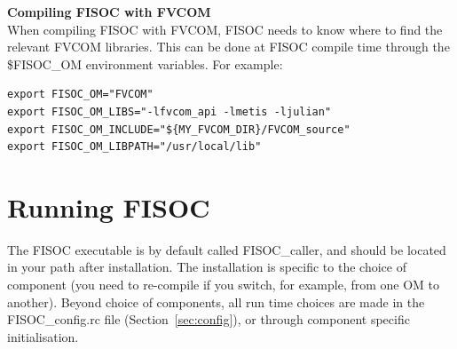 \documentclass[11pt]{article}
\begin{document}
\vspace{10pt}
\textbf{Compiling FISOC with FVCOM}\\
When compiling FISOC with FVCOM, FISOC needs to know where to 
find the relevant FVCOM libraries.  
This can be done at FISOC compile time through the 
\$FISOC\_OM
environment variables.  For example:

\begin{lstlisting}
export FISOC_OM="FVCOM"
export FISOC_OM_LIBS="-lfvcom_api -lmetis -ljulian"
export FISOC_OM_INCLUDE="${MY_FVCOM_DIR}/FVCOM_source"
export FISOC_OM_LIBPATH="/usr/local/lib"
\end{lstlisting}














\section{Running FISOC}
\label{sec:FISOC_SUG}

The FISOC executable is by default called FISOC\_caller, and should be located in your 
path after installation. 
The installation is specific to the choice of component (you need to re-compile if you switch, for 
example, from one OM to another). 
Beyond choice of components, all run time choices are made in the FISOC\_config.rc file
(Section~\ref{sec:config}), 
or through component specific initialisation.
\end{document}
